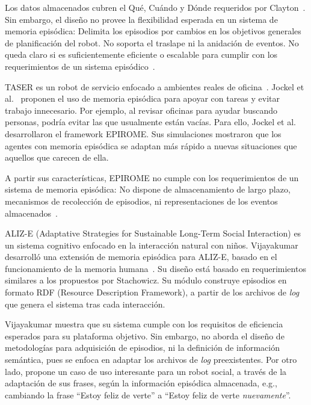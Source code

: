 Los datos almacenados cubren el Qué, Cuándo y Dónde requeridos por Clayton~\cite{CLAYTON20092330}. Sin embargo, el diseño no provee la flexibilidad esperada en un sistema de memoria episódica:  Delimita los episodios por cambios en los objetivos generales de planificación del robot. No soporta el traslape ni la anidación de eventos. No queda claro si es suficientemente eficiente o escalable para cumplir con los requerimientos de un sistema episódico~\cite{Stachowicz2012}.

TASER es un robot de servicio enfocado a ambientes reales de oficina~\cite{Jockel2007}. Jockel et al.~\cite{Jockel2008} proponen el uso de memoria episódica para apoyar con tareas y evitar trabajo innecesario. Por ejemplo, al revisar oficinas para ayudar buscando personas, podría evitar las que usualmente están vacías. Para ello, Jockel et al. desarrollaron el framework EPIROME. Sus simulaciones mostraron que los agentes con memoria episódica se adaptan más rápido a nuevas situaciones que aquellos que carecen de ella.

A partir sus características, EPIROME no cumple con los requerimientos de un sistema de memoria episódica: No dispone de almacenamiento de largo plazo, mecanismos de recolección de episodios, ni representaciones de los eventos almacenados~\cite{Stachowicz2012}.

ALIZ-E (Adaptative Strategies for Sustainable Long-Term Social Interaction) es un sistema cognitivo enfocado en la interacción natural con niños. Vijayakumar desarrolló una extensión de memoria episódica para ALIZ-E, basado en el funcionamiento de la memoria humana~\cite{Vijayakumar2014}.  Su diseño está basado en requerimientos similares a los propuestos por Stachowicz. Su módulo construye episodios en formato RDF (Resource Description Framework), a partir de los archivos de \textit{log} que genera el sistema tras cada interacción.

Vijayakumar muestra que su sistema cumple con los requisitos de eficiencia esperados para su plataforma objetivo. Sin embargo, no aborda el diseño de metodologías para adquisición de episodios, ni la definición de información semántica, pues se enfoca en adaptar los archivos de \textit{log} preexistentes. Por otro lado, propone un caso de uso interesante para un robot social, a través de la adaptación de sus frases, según la información episódica almacenada, e.g., cambiando la frase ``Estoy feliz de verte'' a ``Estoy feliz de verte \textit{nuevamente}''. 


